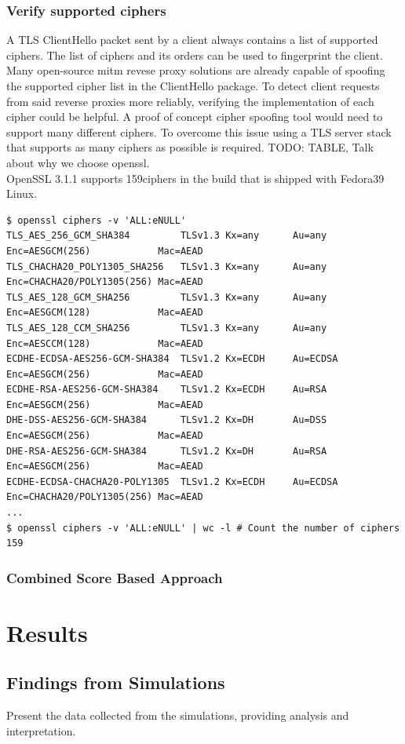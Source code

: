 \documentclass[12pt]{report}
\begin{document}
\newpage
\subsection{Verify supported ciphers}
A TLS ClientHello packet sent by a client always contains a list of supported ciphers. The list of ciphers and its orders can be used to fingerprint the client. Many open-source mitm revese proxy solutions are already capable of spoofing the supported cipher list in the ClientHello package. To detect client requests from said reverse proxies more reliably, verifying the implementation of each cipher could be helpful. A proof of concept cipher spoofing tool would need to support many different ciphers. To overcome this issue using a TLS server stack that supports as many ciphers as possible is required. TODO: TABLE, Talk about why we choose openssl.\\OpenSSL 3.1.1 supports 159ciphers in the build that is shipped with Fedora39 Linux.

\begin{lstlisting}
$ openssl ciphers -v 'ALL:eNULL'
TLS_AES_256_GCM_SHA384         TLSv1.3 Kx=any      Au=any   Enc=AESGCM(256)            Mac=AEAD
TLS_CHACHA20_POLY1305_SHA256   TLSv1.3 Kx=any      Au=any   Enc=CHACHA20/POLY1305(256) Mac=AEAD
TLS_AES_128_GCM_SHA256         TLSv1.3 Kx=any      Au=any   Enc=AESGCM(128)            Mac=AEAD
TLS_AES_128_CCM_SHA256         TLSv1.3 Kx=any      Au=any   Enc=AESCCM(128)            Mac=AEAD
ECDHE-ECDSA-AES256-GCM-SHA384  TLSv1.2 Kx=ECDH     Au=ECDSA Enc=AESGCM(256)            Mac=AEAD
ECDHE-RSA-AES256-GCM-SHA384    TLSv1.2 Kx=ECDH     Au=RSA   Enc=AESGCM(256)            Mac=AEAD
DHE-DSS-AES256-GCM-SHA384      TLSv1.2 Kx=DH       Au=DSS   Enc=AESGCM(256)            Mac=AEAD
DHE-RSA-AES256-GCM-SHA384      TLSv1.2 Kx=DH       Au=RSA   Enc=AESGCM(256)            Mac=AEAD
ECDHE-ECDSA-CHACHA20-POLY1305  TLSv1.2 Kx=ECDH     Au=ECDSA Enc=CHACHA20/POLY1305(256) Mac=AEAD
...
$ openssl ciphers -v 'ALL:eNULL' | wc -l # Count the number of ciphers
159
\end{lstlisting}

\newpage
\subsection{Combined Score Based Approach}

\chapter{Results}
\section{Findings from Simulations}
Present the data collected from the simulations, providing analysis and interpretation.
\end{document}
